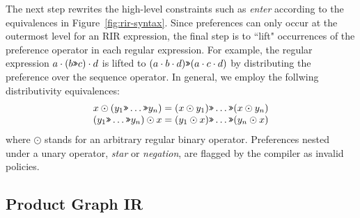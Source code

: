 The next step rewrites the high-level constraints such as \textit{enter} according to the equivalences in Figure~\ref{fig:rir-syntax}. Since preferences can only occur at the outermost level for an RIR expression, the final step is to ``lift" occurrences of the preference operator in each regular expression. For example, the regular expression $a \cdot (b \texttt{>>} c) \cdot d$ is lifted to $(a \cdot b \cdot d) \texttt{>>} (a \cdot c \cdot d)$ by distributing the preference over the sequence operator. In general, we employ the follwing distributivity equivalences:
%
\[ 
\begin{array}{c}
  x \odot (y_1 \texttt{>>} \dots \texttt{>>} y_n) = (x \odot y_1) \texttt{>>} \dots \texttt{>>} (x \odot y_n) \\
  (y_1 \texttt{>>} \dots \texttt{>>} y_n) \odot x = (y_1 \odot x) \texttt{>>} \dots \texttt{>>} (y_n \odot x)
\end{array}
\]
%
where $\odot$ stands for an arbitrary regular binary operator. Preferences nested under a unary operator, \textit{star} or \textit{negation}, are flagged by the compiler as invalid policies.



\subsection{Product Graph IR}

\newcommand{\state}[4]{\node[state,#3](#1)[#4]{#2};}
\newcommand{\transition}[4]{\path[->] (#1) edge [#4] node {#3} (#2);}

